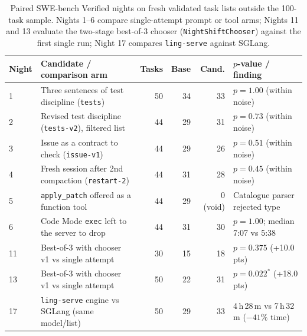\documentclass[11pt]{article}
\newcommand{\code}[1]{\texttt{#1}}
\begin{document}
\begin{table}[tbp]
\centering
\small
\begin{tabularx}{\textwidth}{@{}l X r r r l@{}}
\toprule
Night & Candidate / comparison arm & Tasks & Base & Cand. & $p$-value / finding \\
\midrule
1 & Three sentences of test discipline (\code{tests}) & 50 & 34 & 33 & $p = 1.00$ (within noise) \\
2 & Revised test discipline (\code{tests-v2}), filtered list & 44 & 29 & 31 & $p = 0.73$ (within noise) \\
3 & Issue as a contract to check (\code{issue-v1}) & 44 & 29 & 26 & $p = 0.51$ (within noise) \\
4 & Fresh session after 2nd compaction (\code{restart-2}) & 44 & 31 & 28 & $p = 0.45$ (within noise) \\
5 & \code{apply\_patch} offered as a function tool & 44 & 29 & 0 (void) & Catalogue parser rejected type \\
6 & Code Mode \code{exec} left to the server to drop & 44 & 31 & 30 & $p = 1.00$; median 7:07 vs 5:38 \\
\midrule
11 & Best-of-3 with chooser v1 vs single attempt & 30 & 15 & 18 & $p = 0.375$ (+10.0 pts) \\
13 & Best-of-3 with chooser v1 vs single attempt & 50 & 22 & 31 & $p = 0.022^*$ (+18.0 pts) \\
17 & \code{ling-serve} engine vs SGLang (same model/list) & 50 & 29 & 33 & 4\,h\,28\,m vs 7\,h\,32\,m ($-41\%$ time) \\
\bottomrule
\end{tabularx}
\caption{Paired SWE-bench Verified nights on fresh validated task lists outside the 100-task
sample. Nights 1--6 compare single-attempt prompt or tool arms; Nights 11 and 13 evaluate the
two-stage best-of-3 chooser (\code{NightShiftChooser}) against the first single run; Night 17
compares \code{ling-serve} against SGLang.}
\label{tab:abnights}
\end{table}
\end{document}
